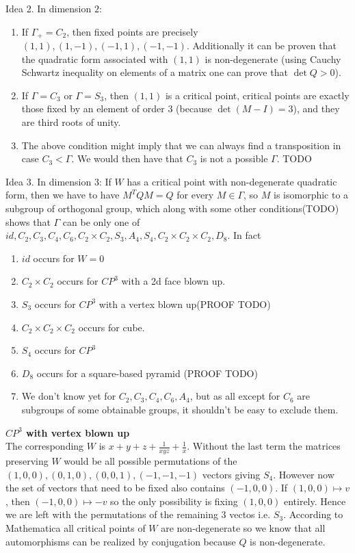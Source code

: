 \documentclass[a4paper]{article}
\begin{document}
Idea 2.
In dimension $2$:
\begin{enumerate}
	\item If $\Gamma_+ = C_2$, then fixed points are precisely $(1,1), (1,-1), (-1,1), (-1, -1)$. Additionally it can be proven that the quadratic form associated with $(1,1)$ is non-degenerate (using Cauchy Schwartz inequality on elements of a matrix one can prove that $\det Q > 0$).
	\item If $\Gamma = C_3$ or $\Gamma = S_3$, then $(1,1)$ is a critical point, critical points are exactly those fixed by an element of order $3$ (because $\det(M-I) = 3$), and they are third roots of unity.
	\item The above condition might imply that we can always find a transposition in case $C_3 < \Gamma$. We would then have that $C_3$ is not a possible $\Gamma$. TODO
\end{enumerate}
Idea 3.
In dimension 3:
If $W$ has a critical point with non-degenerate quadratic form, then we have to have $M^T Q M = Q$ for every $M \in \Gamma$, so $M$ is isomorphic to a subgroup of orthogonal group, which along with some other conditions(TODO) shows that $\Gamma$ can be only one of $id, C_2, C_3, C_4, C_6, C_2 \times C_2, S_3, A_4, S_4, C_2 \times C_2 \times C_2, D_8$. In fact
\begin{enumerate}
	\item $id$ occurs for $W = 0$
	\item $C_2 \times C_2$ occurs for $CP^3$ with a 2d face blown up.
	\item $S_3$ occurs for $CP^3$ with a vertex blown up(PROOF TODO)
	\item $C_2 \times C_2 \times C_2$ occurs for cube.
	\item $S_4$ occurs for $CP^3$
	\item $D_8$ occurs for a square-based pyramid (PROOF TODO)
	\item We don't know yet for $C_2, C_3, C_4, C_6, A_4$, but as all except for $C_6$ are subgroups of some obtainable groups, it shouldn't be easy to exclude them.
\end{enumerate}
\textbf{$CP^3$ with vertex blown up}\\
The corresponding $W$ is $x+y+z+\frac{1}{xyz}+\frac{1}{x}$. Without the last term the matrices preserving $W$ would be all possible permutations of the $(1,0,0),(0,1,0),(0,0,1),(-1,-1,-1)$ vectors giving $S_4$. However now the set of vectors that need to be fixed also contains $(-1,0,0)$. If $(1,0,0)\mapsto v$, then $(-1,0,0)\mapsto -v$ so the only possibility is fixing $(1,0,0)$ entirely. Hence we are left with the permutations of the remaining 3 vectos i.e. $S_3$. According to Mathematica all critical points of $W$ are non-degenerate so we know that all automorphisms can be realized by conjugation because $Q$ is non-degenerate.
\end{document}
